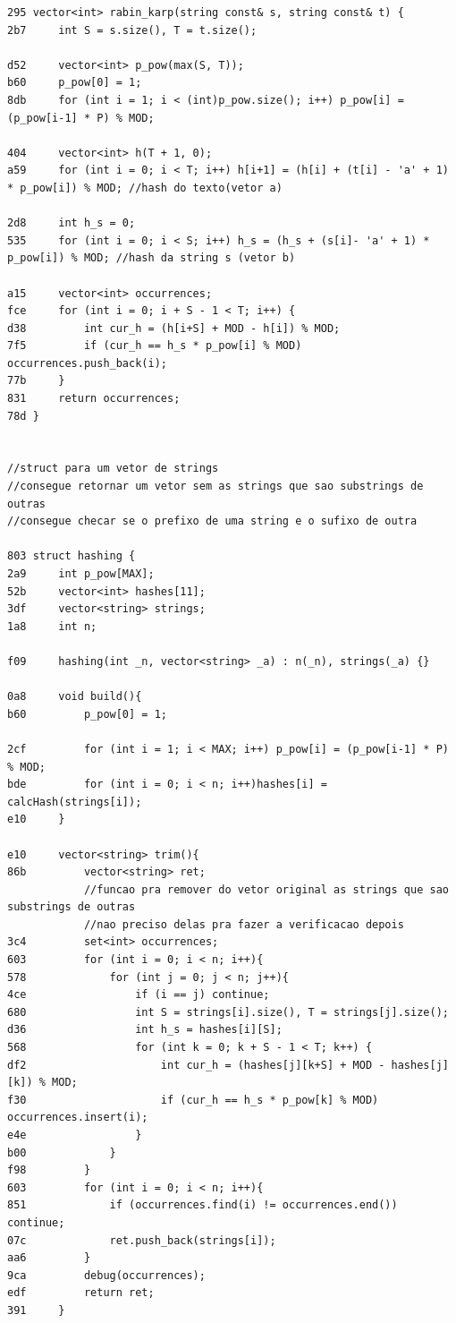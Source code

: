 \documentclass[11pt, a4paper, twoside]{article}
\begin{document}
\begin{lstlisting}
295 vector<int> rabin_karp(string const& s, string const& t) {
2b7     int S = s.size(), T = t.size();
            
d52     vector<int> p_pow(max(S, T)); 
b60     p_pow[0] = 1; 
8db     for (int i = 1; i < (int)p_pow.size(); i++) p_pow[i] = (p_pow[i-1] * P) % MOD;
        
404     vector<int> h(T + 1, 0); 
a59     for (int i = 0; i < T; i++) h[i+1] = (h[i] + (t[i] - 'a' + 1) * p_pow[i]) % MOD; //hash do texto(vetor a)
        
2d8     int h_s = 0; 
535     for (int i = 0; i < S; i++) h_s = (h_s + (s[i]- 'a' + 1) * p_pow[i]) % MOD; //hash da string s (vetor b)
        
a15     vector<int> occurrences;
fce     for (int i = 0; i + S - 1 < T; i++) {
d38         int cur_h = (h[i+S] + MOD - h[i]) % MOD;
7f5         if (cur_h == h_s * p_pow[i] % MOD) occurrences.push_back(i);
77b     }
831     return occurrences;
78d }


//struct para um vetor de strings
//consegue retornar um vetor sem as strings que sao substrings de outras
//consegue checar se o prefixo de uma string e o sufixo de outra

803 struct hashing {
2a9     int p_pow[MAX]; 
52b     vector<int> hashes[11];
3df     vector<string> strings;
1a8     int n;
        
f09     hashing(int _n, vector<string> _a) : n(_n), strings(_a) {} 
    
0a8     void build(){
b60         p_pow[0] = 1; 
    
2cf         for (int i = 1; i < MAX; i++) p_pow[i] = (p_pow[i-1] * P) % MOD;
bde         for (int i = 0; i < n; i++)hashes[i] = calcHash(strings[i]);
e10     }
    
e10     vector<string> trim(){
86b         vector<string> ret;
            //funcao pra remover do vetor original as strings que sao substrings de outras
            //nao preciso delas pra fazer a verificacao depois
3c4         set<int> occurrences;
603         for (int i = 0; i < n; i++){
578             for (int j = 0; j < n; j++){
4ce                 if (i == j) continue;
680                 int S = strings[i].size(), T = strings[j].size();
d36                 int h_s = hashes[i][S];
568                 for (int k = 0; k + S - 1 < T; k++) {
df2                     int cur_h = (hashes[j][k+S] + MOD - hashes[j][k]) % MOD;
f30                     if (cur_h == h_s * p_pow[k] % MOD) occurrences.insert(i);
e4e                 }
b00             }
f98         }
603         for (int i = 0; i < n; i++){
851             if (occurrences.find(i) != occurrences.end()) continue;
07c             ret.push_back(strings[i]);
aa6         }
9ca         debug(occurrences);
edf         return ret;
391     }
        

\end{lstlisting}
\end{document}
